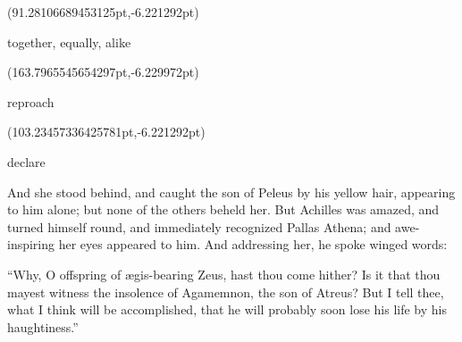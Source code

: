 \documentclass{ransom}
\begin{document}
\begin{foreignpage}
{\begin{textblock*}{26.55093pt}(91.28106689453125pt,\pdfpageheight-125.37759399414062pt-6.221292pt)\parbox[b]{26.55093pt}{\begin{blacktext}\begin{latin}together, equally, alike\end{latin}\end{blacktext}}\end{textblock*}
\begin{textblock*}{45.89005pt}(163.7965545654297pt,\pdfpageheight-179.18824768066406pt-6.229972pt)\parbox[b]{45.89005pt}{\begin{blacktext}\begin{latin}reproach\end{latin}\end{blacktext}}\end{textblock*}
\begin{textblock*}{34.11032pt}(103.23457336425781pt,\pdfpageheight-152.18824768066406pt-6.221292pt)\parbox[b]{34.11032pt}{\begin{blacktext}\begin{latin}declare\end{latin}\end{blacktext}}\end{textblock*}
 }
\end{foreignpage}


And she stood behind,
and caught the son of Peleus by his yellow hair, appearing to him
alone; but none of the others beheld her. But Achilles was amazed, and
turned himself round, and immediately recognized Pallas Athena; and
awe-inspiring her eyes appeared to him. And addressing her, he spoke
winged words:

“Why, O offspring of ægis-bearing Zeus, hast thou come hither? Is it
that thou mayest witness the insolence of Agamemnon, the son of Atreus?
But I tell thee, what I think will be accomplished, that he will
probably soon lose his life by his haughtiness.”
\end{document}
